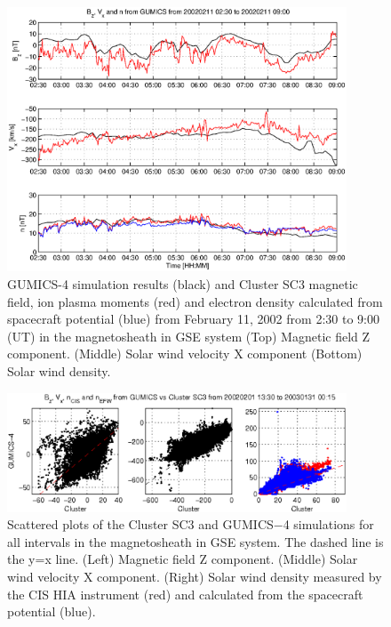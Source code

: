 \documentclass[linenumbers,draft]{agujournal}
\begin{document}
\begin{figure}[h]
\centering
\includegraphics[width=0.9\textwidth,angle=0]{swe-2020-corr-f08.eps}  
\caption{GUMICS-4 simulation results (black) and Cluster SC3 magnetic field, ion plasma moments (red) and electron density calculated from spacecraft potential (blue) from February 11, 2002 from 2:30 to 9:00 (UT) in the magnetosheath in GSE system  (Top) Magnetic field Z component. (Middle) Solar wind velocity X component (Bottom) Solar wind density.}
\label{fig:mshplot}
\end{figure}

\pagebreak

\begin{figure}[h]
\centering
\includegraphics[width=0.9\textwidth,angle=0]{swe-2020-corr-f09.eps}
\caption{Scattered plots of the Cluster SC3 and GUMICS$-$4 simulations for all intervals in the magnetosheath in GSE system. The dashed line is the y=x line. (Left) Magnetic field Z component. (Middle) Solar wind velocity X component. (Right) Solar wind density measured by the CIS HIA instrument (red) and calculated from the spacecraft potential (blue).}
\label{fig:mshscatplot}
\end{figure}

\pagebreak
\end{document}
